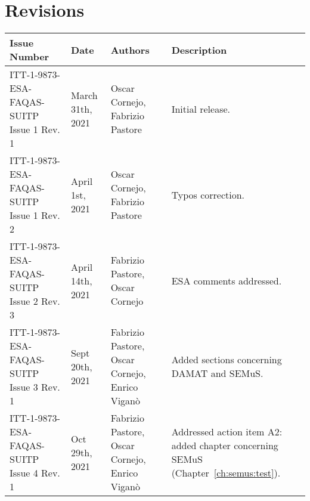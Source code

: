 
\section*{Revisions}
\label{sec:revisions}

\setlength\LTleft{0pt}
\setlength\LTright{0pt}
\scriptsize 
\begin{longtable}{|p{2cm}|p{2cm}|p{2cm}|p{8.5cm}|@{}}
\label{table:codeoperators} \\
\hline
\textbf{Issue Number}&\textbf{Date}&\textbf{Authors}&\textbf{Description}\\
\hline
ITT-1-9873-ESA-FAQAS-SUITP
Issue 1 Rev. 1&
March 31th, 2021&
Oscar Cornejo, Fabrizio Pastore&
\begin{minipage}{8cm}
Initial release.
\end{minipage}
\\
\hline
ITT-1-9873-ESA-FAQAS-SUITP
Issue 1 Rev. 2&
April 1st, 2021&
Oscar Cornejo, Fabrizio Pastore&
\begin{minipage}{8cm}
Typos correction.
\end{minipage}
\\
\hline
ITT-1-9873-ESA-FAQAS-SUITP
Issue 2 Rev. 3&
April 14th, 2021&
Fabrizio Pastore, Oscar Cornejo&
\begin{minipage}{8cm}
ESA comments addressed.
\end{minipage}
\\
\hline
ITT-1-9873-ESA-FAQAS-SUITP
Issue 3 Rev. 1&
Sept 20th, 2021&
Fabrizio Pastore, Oscar Cornejo, Enrico Viganò&
\begin{minipage}{8cm}
Added sections concerning DAMAT and SEMuS.
\end{minipage}
\\
\hline
ITT-1-9873-ESA-FAQAS-SUITP
Issue 4 Rev. 1&
Oct 29th, 2021&
Fabrizio Pastore, Oscar Cornejo, Enrico Viganò&
\begin{minipage}{8cm}
Addressed action item A2: added chapter concerning SEMuS (Chapter~\ref{ch:semus:test}).
\end{minipage}
\\
\hline



                                                    
\end{longtable}
\normalsize

\clearpage